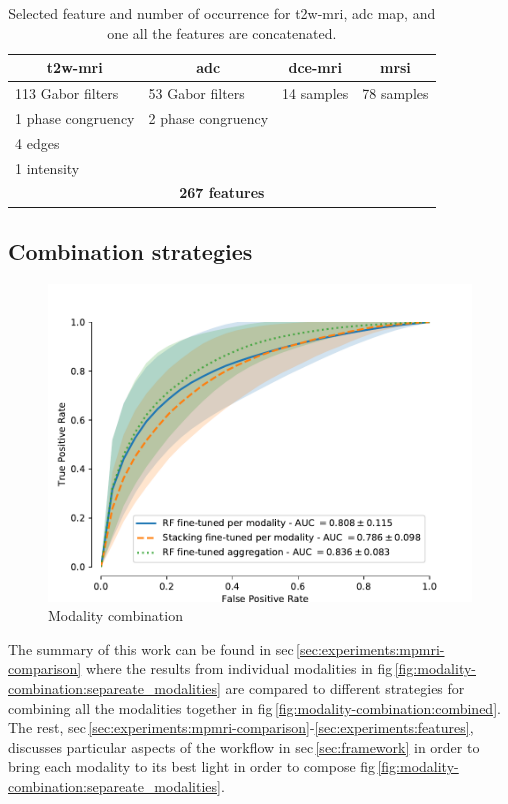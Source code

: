 \documentclass[a4paper,num-refs]{wiley-article}
\begin{document}
\begin{table}
  \caption{Selected feature and number of occurrence for \acs*{t2w}-\acs*{mri}, \acs*{adc} map, and one all the features are concatenated.}
  \centering
  \scriptsize
  \begin{tabular}{llll}
    \toprule
    \multicolumn{1}{c}{\textbf{\acs*{t2w}-\acs*{mri}}} & \multicolumn{1}{c}{\textbf{\acs*{adc}}} & \multicolumn{1}{c}{\textbf{\acs*{dce}-\acs*{mri}}} & \multicolumn{1}{c}{\textbf{\acs*{mrsi}}} \\
    \midrule
    113 Gabor filters & 53 Gabor filters & 14 samples  & 78 samples \\
    1 phase congruency & 2 phase congruency & & \\ 
    4 edges & & & \\
    1 intensity & & & \\
    \midrule
    \multicolumn{4}{c}{\textbf{267 features}} \\
    \bottomrule
  \end{tabular}
  \label{tab:selfeatocc}
\end{table}

\subsection{Combination strategies}

\begin{figure}
  \centering
  \includegraphics[width=.45\textwidth]{images/combine_all.pdf}  
  \caption[modality combination] {Modality combination}
  \label{fig:modality-combination}
\end{figure}


The summary of this work can be found in \ac{sec}\,\ref{sec:experiments:mpmri-comparison}
where the results from individual modalities in
\Ac{fig}\,\ref{fig:modality-combination:separeate_modalities} are compared to
different strategies for combining all the modalities together in \Ac{fig}\,\ref{fig:modality-combination:combined}.
The rest,
\ac{sec}\,\ref{sec:experiments:mpmri-comparison}-\ref{sec:experiments:features}, 
discusses particular aspects
of the workflow in \Ac{sec}\,\ref{sec:framework} in order to bring each
modality to its best light in order to compose
\Ac{fig}\,\ref{fig:modality-combination:separeate_modalities}.
\end{document}
